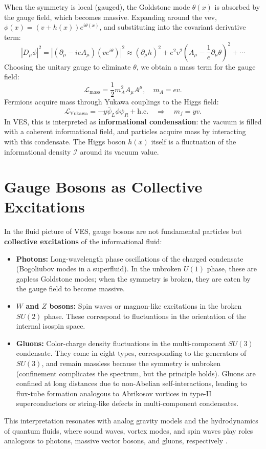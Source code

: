 \documentclass[12pt,a4paper]{book}
\newcommand{\I}{\mathcal{I}}
\begin{document}
When the symmetry is local (gauged), the Goldstone mode $\theta(x)$ is absorbed by the gauge field, which becomes massive. Expanding around the vev, $\phi(x) = (v + h(x)) e^{i\theta(x)}$, and substituting into the covariant derivative term:
\begin{equation}
    |D_\mu \phi|^2 = |(\partial_\mu - i e A_\mu)(v e^{i\theta})|^2 \approx (\partial_\mu h)^2 + e^2 v^2 (A_\mu - \frac{1}{e}\partial_\mu \theta)^2 + \cdots
\end{equation}
Choosing the unitary gauge to eliminate $\theta$, we obtain a mass term for the gauge field:
\begin{equation}
    \mathcal{L}_{\text{mass}} = \frac12 m_A^2 A_\mu A^\mu, \quad m_A = e v.
\end{equation}
Fermions acquire mass through Yukawa couplings to the Higgs field:
\begin{equation}
    \mathcal{L}_{\text{Yukawa}} = -y \bar{\psi}_L \phi \psi_R + \text{h.c.} \quad \Rightarrow \quad m_f = y v.
\end{equation}
In VES, this is interpreted as \textbf{informational condensation}: the vacuum is filled with a coherent informational field, and particles acquire mass by interacting with this condensate. The Higgs boson $h(x)$ itself is a fluctuation of the informational density $\I$ around its vacuum value.

\section{Gauge Bosons as Collective Excitations}

In the fluid picture of VES, gauge bosons are not fundamental particles but \textbf{collective excitations} of the informational fluid:
\begin{itemize}
    \item \textbf{Photons:} Long-wavelength phase oscillations of the charged condensate (Bogoliubov modes in a superfluid). In the unbroken $U(1)$ phase, these are gapless Goldstone modes; when the symmetry is broken, they are eaten by the gauge field to become massive.
    \item \textbf{$W$ and $Z$ bosons:} Spin waves or magnon-like excitations in the broken $SU(2)$ phase. These correspond to fluctuations in the orientation of the internal isospin space.
    \item \textbf{Gluons:} Color-charge density fluctuations in the multi-component $SU(3)$ condensate. They come in eight types, corresponding to the generators of $SU(3)$, and remain massless because the symmetry is unbroken (confinement complicates the spectrum, but the principle holds). Gluons are confined at long distances due to non-Abelian self-interactions, leading to flux-tube formation analogous to Abrikosov vortices in type-II superconductors or string-like defects in multi-component condensates.
\end{itemize}
This interpretation resonates with analog gravity models and the hydrodynamics of quantum fluids, where sound waves, vortex modes, and spin waves play roles analogous to photons, massive vector bosons, and gluons, respectively \cite{volovik2003, unruh1981}.
\end{document}
